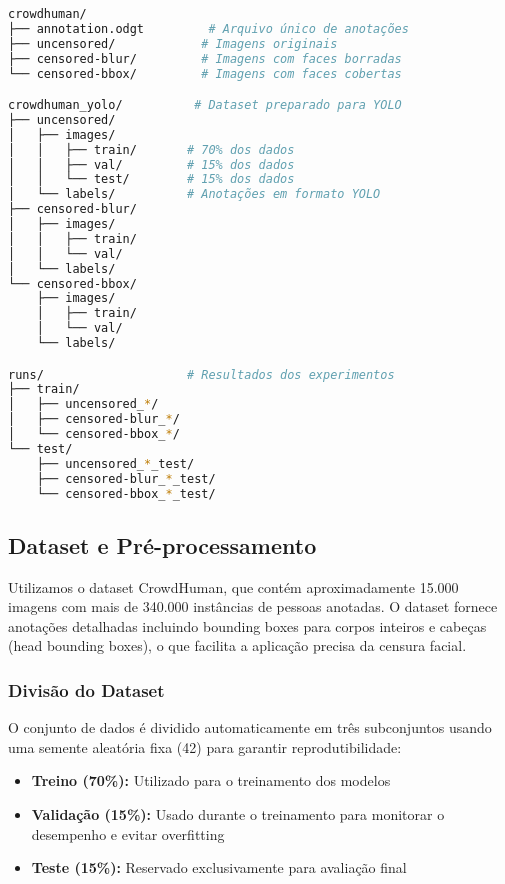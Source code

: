 \documentclass[12pt,a4paper]{article}
\begin{document}
\begin{lstlisting}[language=bash,caption=Estrutura de Diretórios do Projeto]
crowdhuman/
├── annotation.odgt         # Arquivo único de anotações
├── uncensored/            # Imagens originais
├── censored-blur/         # Imagens com faces borradas
└── censored-bbox/         # Imagens com faces cobertas

crowdhuman_yolo/          # Dataset preparado para YOLO
├── uncensored/
│   ├── images/
│   │   ├── train/       # 70% dos dados
│   │   ├── val/         # 15% dos dados
│   │   └── test/        # 15% dos dados
│   └── labels/          # Anotações em formato YOLO
├── censored-blur/
│   ├── images/
│   │   ├── train/
│   │   └── val/
│   └── labels/
└── censored-bbox/
    ├── images/
    │   ├── train/
    │   └── val/
    └── labels/

runs/                    # Resultados dos experimentos
├── train/
│   ├── uncensored_*/
│   ├── censored-blur_*/
│   └── censored-bbox_*/
└── test/
    ├── uncensored_*_test/
    ├── censored-blur_*_test/
    └── censored-bbox_*_test/
\end{lstlisting}

\subsection{Dataset e Pré-processamento}
Utilizamos o dataset CrowdHuman, que contém aproximadamente 15.000 imagens com mais de 340.000 instâncias de pessoas anotadas. O dataset fornece anotações detalhadas incluindo bounding boxes para corpos inteiros e cabeças (head bounding boxes), o que facilita a aplicação precisa da censura facial.

\subsubsection{Divisão do Dataset}
O conjunto de dados é dividido automaticamente em três subconjuntos usando uma semente aleatória fixa (42) para garantir reprodutibilidade:

\begin{itemize}
    \item \textbf{Treino (70\%):} Utilizado para o treinamento dos modelos
    \item \textbf{Validação (15\%):} Usado durante o treinamento para monitorar o desempenho e evitar overfitting
    \item \textbf{Teste (15\%):} Reservado exclusivamente para avaliação final
\end{itemize}
\end{document}
